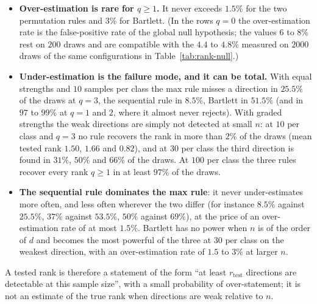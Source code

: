 \documentclass[11pt,a4paper]{article}
\theoremstyle{plain}
\theoremstyle{definition}
\theoremstyle{remark}
\begin{document}
\begin{itemize}
  \item \textbf{Over-estimation is rare for $q\ge1$.} It never exceeds
  $1.5\%$ for the two permutation rules and $3\%$ for Bartlett. (In the
  rows $q=0$ the over-estimation rate is the false-positive rate of the
  global null hypothesis; the values $6$ to $8\%$ rest on $200$ draws and
  are compatible with the $4.4$ to $4.8\%$ measured on $2000$ draws of the
  same configurations in Table~\ref{tab:rank-null}.)
  \item \textbf{Under-estimation is the failure mode, and it can be
  total.} With equal strengths and $10$ samples per class the max rule
  misses a direction in $25.5\%$ of the draws at $q=3$, the sequential
  rule in $8.5\%$, Bartlett in $51.5\%$ (and in $97$ to $99\%$ at $q=1$
  and $2$, where it almost never rejects). With graded strengths the weak
  directions are simply not detected at small $n$: at $10$ per class and
  $q=3$ no rule recovers the rank in more than $2\%$ of the draws (mean
  tested rank $1.50$, $1.66$ and $0.82$), and at $30$ per class the third
  direction is found in $31\%$, $50\%$ and $66\%$ of the draws. At $100$
  per class the three rules recover every rank $q\ge1$ in at least $97\%$
  of the draws.
  \item \textbf{The sequential rule dominates the max rule}: it never
  under-estimates more often, and less often wherever the two differ (for
  instance $8.5\%$ against $25.5\%$, $37\%$ against $53.5\%$, $50\%$
  against $69\%$), at the price
  of an over-estimation rate of at most $1.5\%$. Bartlett has no power
  when $n$ is of the order of $d$ and becomes the most powerful of the
  three at $30$ per class on the weakest direction, with an
  over-estimation rate of $1.5$ to $3\%$ at larger $n$.
\end{itemize}
A tested rank is therefore a statement of the form ``at least
$r_{\mathrm{test}}$ directions are detectable at this sample size'', with
a small probability of over-statement; it is not an estimate of the true
rank when directions are weak relative to $n$.
\end{document}
